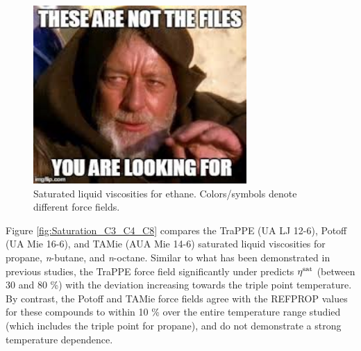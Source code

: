 \documentclass[preprint,review,12pt]{elsarticle}
\begin{document}
%

\begin{figure}[p!]
	\centering
	\includegraphics[width=3.2in]{empty_figure.jpg}
	\caption{Saturated liquid viscosities for ethane. Colors/symbols denote different force fields.}
	\label{fig:Saturation_Ethane}
\end{figure} 

Figure \ref{fig:Saturation_C3_C4_C8} compares the TraPPE (UA LJ 12-6), Potoff (UA Mie 16-6), and TAMie (AUA Mie 14-6) saturated liquid viscosities for propane, \textit{n}-butane, and \textit{n}-octane. Similar to what has been demonstrated in previous studies, the TraPPE force field significantly under predicts $\eta^{\rm sat}$ (between 30 and 80 \%) with the deviation increasing towards the triple point temperature. By contrast, the Potoff and TAMie force fields agree with the REFPROP values for these compounds to within 10 \% over the entire temperature range studied (which includes the triple point for propane), and do not demonstrate a strong temperature dependence.  
\end{document}
